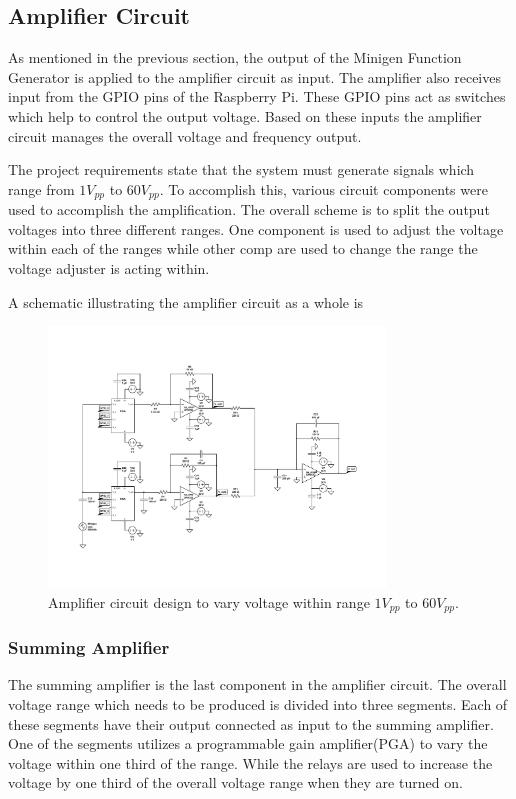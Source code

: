 \documentclass{article}	%
\begin{document}
\begin{multicols}{2}
\subsection{Amplifier Circuit}
As mentioned in the previous section,
the output of the Minigen Function Generator
is applied to the amplifier circuit as input.
The amplifier also receives input from 
the GPIO pins of the Raspberry Pi.
These GPIO pins act as switches which help to control the output voltage.
Based on these inputs 
the amplifier circuit manages the overall 
voltage and frequency output.

The project requirements state that the system must 
generate signals which range from $1V_{pp}$ to $60V_{pp}$. 
To accomplish this,
various circuit components were used to accomplish the amplification.
The overall scheme is to split the output voltages into
three different ranges.
One component is used to adjust the voltage within each of the ranges while
other comp are used to change the range the voltage adjuster is acting within.

A schematic illustrating the amplifier circuit as a whole is 

\begin{figure}[!hbt]
\begin{center}
\includegraphics[width=0.8\textwidth,keepaspectratio]{circuit_diagram.pdf}
\end{center}
\caption{Amplifier circuit design to vary voltage 
    within range $1V_{pp}$ to $60V_{pp}$. }
\end{figure}

\subsubsection{Summing Amplifier}
The summing amplifier is the last component
in the amplifier circuit.
The overall voltage range which needs to be produced is divided into three segments.
Each of these segments have their output connected as
input to the summing amplifier.
One of the segments utilizes a programmable gain amplifier(PGA)
to vary the voltage within one third of the range.
While the relays are used to increase the voltage by one third of the overall voltage range when they are turned on.


\end{multicols}
\end{document}

